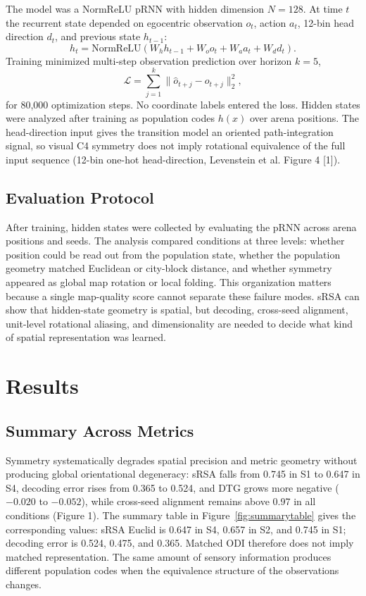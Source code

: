 ﻿\documentclass[10pt]{article}
\begin{document}
The model was a NormReLU pRNN with hidden dimension $N=128$. At time $t$ the recurrent state depended on egocentric observation $o_t$, action $a_t$, 12-bin head direction $d_t$, and previous state $h_{t-1}$:
\[
h_t=\mathrm{NormReLU}(W_h h_{t-1}+W_o o_t+W_a a_t+W_d d_t).
\]
Training minimized multi-step observation prediction over horizon $k=5$,
\[
\mathcal{L}=\sum_{j=1}^{k}\|\hat{o}_{t+j}-o_{t+j}\|_2^2,
\]
for 80,000 optimization steps. No coordinate labels entered the loss. Hidden states were analyzed after training as population codes $h(x)$ over arena positions. The head-direction input gives the transition model an oriented path-integration signal, so visual C4 symmetry does not imply rotational equivalence of the full input sequence (12-bin one-hot head-direction, Levenstein et al. Figure 4 [1]).

\subsection{Evaluation Protocol}

After training, hidden states were collected by evaluating the pRNN across arena positions and seeds. The analysis compared conditions at three levels: whether position could be read out from the population state, whether the population geometry matched Euclidean or city-block distance, and whether symmetry appeared as global map rotation or local folding. This organization matters because a single map-quality score cannot separate these failure modes. sRSA can show that hidden-state geometry is spatial, but decoding, cross-seed alignment, unit-level rotational aliasing, and dimensionality are needed to decide what kind of spatial representation was learned.

\section{Results}

\subsection{Summary Across Metrics}

Symmetry systematically degrades spatial precision and metric geometry without producing global orientational degeneracy: sRSA falls from 0.745 in S1 to 0.647 in S4, decoding error rises from 0.365 to 0.524, and DTG grows more negative ($-0.020$ to $-0.052$), while cross-seed alignment remains above 0.97 in all conditions (Figure 1). The summary table in Figure~\ref{fig:summarytable} gives the corresponding values: sRSA Euclid is 0.647 in S4, 0.657 in S2, and 0.745 in S1; decoding error is 0.524, 0.475, and 0.365. Matched ODI therefore does not imply matched representation. The same amount of sensory information produces different population codes when the equivalence structure of the observations changes.
\end{document}
